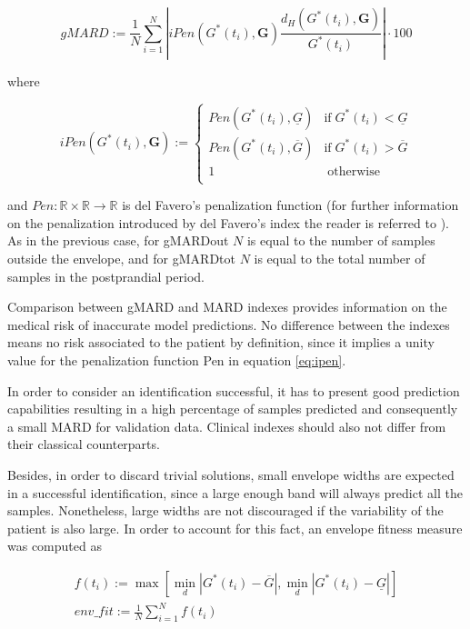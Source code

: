 \begin{equation}
	gMARD:=\frac{1}{N} \sum\limits_{i=1}^{N} \left| iPen\left( G^{\ast}(t_i),\boldsymbol{G}\right) \frac{ d_H(G^{\ast}(t_i),\boldsymbol{G})}{G^{\ast}(t_i)} \right| \cdot 100		
\label{eq:gmard}
\end{equation}

where

\begin{equation}
	iPen\left( G^{\ast}(t_i),\boldsymbol{G}\right):= \begin{cases}
	Pen\left(G^{\ast}(t_i),\underline{G} \right) & \text{if} \; G^{\ast}(t_i)<\underline{G}  \\
	Pen\left(G^{\ast}(t_i),\overline{G} \right) & \text{if} \; G^{\ast}(t_i)>\overline{G}  \\
	1 & \; \text{otherwise} \\
	\end{cases}
\label{eq:ipen}
\end{equation}
			
and $Pen:\mathbb{R} \times \mathbb{R} \rightarrow \mathbb{R}$ is del Favero's penalization function (for further information on the penalization introduced by del Favero's index the reader is referred to \cite{del2012glucose}). As in the previous case, for gMARDout $N$ is equal to the number of samples outside the envelope, and for gMARDtot $N$ is equal to the total number of samples in the postprandial period. 

Comparison between gMARD and MARD indexes provides information on the medical risk of inaccurate model predictions. No difference between the indexes means no risk associated to the patient by definition, since it implies a unity value for the penalization function Pen in equation \eqref{eq:ipen}. 

In order to consider an identification successful, it has to present good prediction capabilities resulting in a high percentage of samples predicted and consequently a small MARD for validation data. Clinical indexes should also not differ from their classical counterparts. 

Besides, in order to discard trivial solutions, small envelope widths are expected in a successful identification, since a large enough band will always predict all the samples. Nonetheless, large widths are not discouraged if the variability of the patient is also large. In order to account for this fact, an envelope fitness measure was computed as

\begin{gather}
f(t_i):=\max\left[\min_d \left| G^{\ast}(t_i) - \overline{G} \right|, \min_d \left| G^{\ast}(t_i)-\underline{G} \right|\right] \label{eq:env_fitness} \\
env\_fit:= \frac{1}{N} \sum\limits_{i=1}^{N} f(t_i) \label{eq:env_fitness2}
\end{gather}
	
